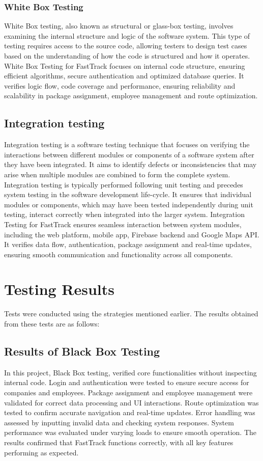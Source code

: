 \subsubsection{White Box Testing}
White Box testing, also known as structural or glass-box testing, involves examining the
internal structure and logic of the software system. This type of
testing requires access to the source code, allowing testers to design test cases based on the
understanding of how the code is structured and how it operates. White Box Testing for FastTrack focuses on internal code structure, ensuring efficient algorithms, secure authentication and optimized database queries. It verifies logic flow, code coverage and performance, ensuring reliability and scalability in package assignment, employee management and route optimization.
\subsection{Integration testing}
Integration testing is a software testing technique that focuses on verifying the interactions
between different modules or components of a software system after they have been
integrated. It aims to identify defects or inconsistencies that may arise when multiple
modules are combined to form the complete system. Integration testing is typically
performed following unit testing and precedes system testing in the software development
life-cycle. It ensures that individual modules or components, which may have been tested
independently during unit testing, interact correctly when integrated into the larger
system. Integration Testing for FastTrack ensures seamless interaction between system modules, including the web platform, mobile app, Firebase backend and Google Maps API. It verifies data flow, authentication, package assignment and real-time updates, ensuring smooth communication and functionality across all components.
\section{Testing Results}
Tests were conducted using the strategies mentioned earlier. The results obtained from
these tests are as follows:
\subsection{Results of Black Box Testing}
In this project, Black Box testing, verified core functionalities without inspecting internal code. Login and authentication were tested to ensure secure access for companies and employees. Package assignment and employee management were validated for correct data processing and UI interactions. Route optimization was tested to confirm accurate navigation and real-time updates. Error handling was assessed by inputting invalid data and checking system responses. System performance was evaluated under varying loads to ensure smooth operation. The results confirmed that FastTrack functions correctly, with all key features performing as expected. 
